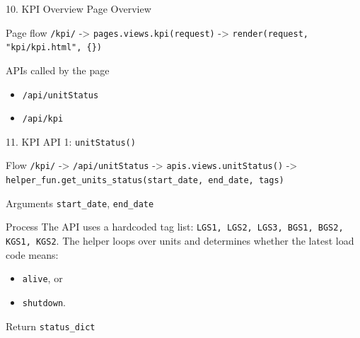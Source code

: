 \documentclass[aspectratio=169]{beamer}
\begin{document}
\begin{frame}{10. KPI Overview Page Overview}
\justifying
\begin{block}{Page flow}
\texttt{/kpi/} -> \texttt{pages.views.kpi(request)} ->
\texttt{render(request, "kpi/kpi.html", \{\})}
\end{block}

\begin{block}{APIs called by the page}
\begin{itemize}
    \item \texttt{/api/unitStatus}
    \item \texttt{/api/kpi}
\end{itemize}
\end{block}
\end{frame}

\begin{frame}{11. KPI API 1: \texttt{unitStatus()}}
\justifying
\begin{block}{Flow}
\texttt{/kpi/} -> \texttt{/api/unitStatus} ->
\texttt{apis.views.unitStatus()} ->
\texttt{helper\_fun.get\_units\_status(start\_date, end\_date, tags)}
\end{block}

\begin{block}{Arguments}
\texttt{start\_date}, \texttt{end\_date}
\end{block}

\begin{block}{Process}
The API uses a hardcoded tag list:
\texttt{LGS1, LGS2, LGS3, BGS1, BGS2, KGS1, KGS2}.
The helper loops over units and determines whether the latest load code means:
\begin{itemize}
    \item \texttt{alive}, or
    \item \texttt{shutdown}.
\end{itemize}
\end{block}

\begin{block}{Return}
\texttt{status\_dict}
\end{block}
\end{frame}
\end{document}
